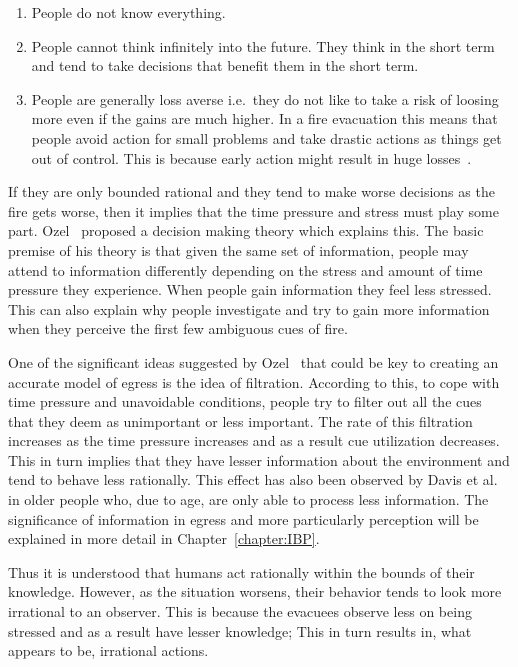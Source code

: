 \begin{enumerate}
\item People do not know everything.
\item People cannot think infinitely into the future. They think in the short term and tend to take decisions that benefit them in the short term.
\item People are generally loss averse i.e.\ they do not like to take a risk of loosing more even if the gains are much higher. In a fire evacuation this means that people avoid action for small problems and take drastic actions as things get out of control. This is because early action might result in huge losses~\cite{Graham:2000vl}.
\end{enumerate}

If they are only bounded rational and they tend to make worse decisions as the fire gets worse, then it implies that the time pressure and stress must play some part. Ozel~\cite{Ozel:2001tn} proposed a decision making theory which explains this. The basic premise of his theory is that given the same set of information, people may attend to information differently depending on the stress and amount of time pressure they experience. When people gain information they feel less stressed. This can also explain why people investigate and try to gain more information when they perceive the first few ambiguous cues of fire. %

One of the significant ideas suggested by Ozel~\cite{Ozel:2001tn} that could be key to creating an accurate model of egress is the idea of filtration. According to this, to cope with time pressure and unavoidable conditions, people try to filter out all the cues that they deem as unimportant or less important. The rate of this filtration increases as the time pressure increases and as a result cue utilization decreases. This in turn implies that they have lesser information about the environment and tend to behave less rationally. This effect has also been observed by Davis et al.~\cite{Davis01122009} in older people who, due to age, are only able to process less information. The significance of information in egress and more particularly perception will be explained in more detail in Chapter~\ref{chapter:IBP}.

Thus it is understood that humans act rationally within the bounds of their knowledge. However, as the situation worsens, their behavior tends to look more irrational to an observer. This is because the evacuees observe less on being stressed and as a result have lesser knowledge; This in turn results in, what appears to be, irrational actions.

